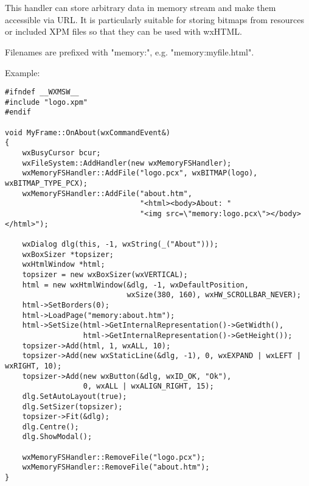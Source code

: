 %
%

\section{}\label{wxmemoryfshandler}

This  handler can store arbitrary 
data in memory stream and make them accessible via URL. It is particularly
suitable for storing bitmaps from resources or included XPM files so that
they can be used with wxHTML.

Filenames are prefixed with "memory:", e.g. "memory:myfile.html".

Example:

\begin{verbatim}
#ifndef __WXMSW__
#include "logo.xpm"
#endif

void MyFrame::OnAbout(wxCommandEvent&)
{
    wxBusyCursor bcur;
    wxFileSystem::AddHandler(new wxMemoryFSHandler);
    wxMemoryFSHandler::AddFile("logo.pcx", wxBITMAP(logo), wxBITMAP_TYPE_PCX);
    wxMemoryFSHandler::AddFile("about.htm", 
                               "<html><body>About: "
                               "<img src=\"memory:logo.pcx\"></body></html>");

    wxDialog dlg(this, -1, wxString(_("About")));
    wxBoxSizer *topsizer;
    wxHtmlWindow *html;
    topsizer = new wxBoxSizer(wxVERTICAL);
    html = new wxHtmlWindow(&dlg, -1, wxDefaultPosition, 
                            wxSize(380, 160), wxHW_SCROLLBAR_NEVER);
    html->SetBorders(0);
    html->LoadPage("memory:about.htm");
    html->SetSize(html->GetInternalRepresentation()->GetWidth(), 
                  html->GetInternalRepresentation()->GetHeight());
    topsizer->Add(html, 1, wxALL, 10);
    topsizer->Add(new wxStaticLine(&dlg, -1), 0, wxEXPAND | wxLEFT | wxRIGHT, 10);
    topsizer->Add(new wxButton(&dlg, wxID_OK, "Ok"), 
                  0, wxALL | wxALIGN_RIGHT, 15);
    dlg.SetAutoLayout(true);
    dlg.SetSizer(topsizer);
    topsizer->Fit(&dlg);
    dlg.Centre();
    dlg.ShowModal();
    
    wxMemoryFSHandler::RemoveFile("logo.pcx");
    wxMemoryFSHandler::RemoveFile("about.htm");
}
\end{verbatim}



\\

